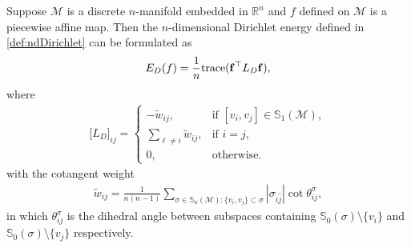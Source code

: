 \documentclass{article}
\begin{document}
\begin{lemma} \label{lma:Dirichlet}
Suppose $\mathcal{M}$ is a discrete $n$-manifold embedded in $\mathbb{R}^n$ and $f$ defined on $\mathcal{M}$ is a piecewise affine map. Then the $n$-dimensional Dirichlet energy defined in \eqref{def:ndDirichlet} can be formulated as
\begin{align} \label{eq:discreteED}
    E_D(f) = \frac{1}{n}\mathrm{trace}(\mathbf{f}^\top L_D \mathbf{f}),
\end{align}
where
\begin{align} \label{eq:LD}
    \big[L_D\big]_{ij} = \begin{cases}
        -\tilde{w}_{ij}, & \textrm{if } [v_i,v_j] \in \mathbb{S}_1(\mathcal{M}),\\
        \sum_{\ell \neq i} \tilde{w}_{ij}, & \textrm{if } i = j,\\
        0, & \textrm{otherwise.}
    \end{cases}
\end{align}
with the cotangent weight
\begin{align}
    \tilde{w}_{ij} = \frac{1}{n(n-1)}\sum_{\sigma\in \mathbb{S}_n(\mathcal{M}):\{v_i,v_j\}\subset\sigma} |\sigma_{\hat{i}\hat{j}}| \cot\theta_{ij}^\sigma,
\end{align}
in which $\theta_{ij}^{\sigma}$ is the dihedral angle between subspaces containing $\mathbb{S}_0(\sigma)\setminus \{v_i\}$ and $\mathbb{S}_0(\sigma)\setminus \{v_j\}$ respectively.
\end{lemma}
\end{document}

